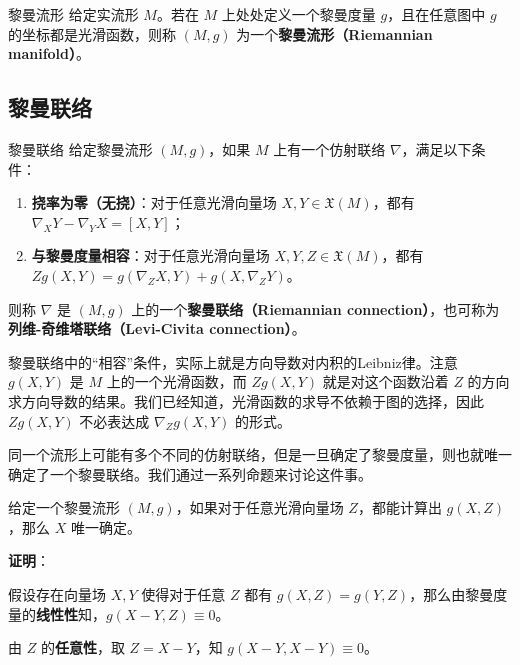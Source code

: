 \begin{definition}{黎曼流形}
给定实流形 $M$。若在 $M$ 上处处定义一个黎曼度量 $g$，且在任意图中 $g$ 的坐标都是光滑函数，则称 $(M, g)$ 为一个\textbf{黎曼流形（Riemannian manifold）}。
\end{definition}





\subsection{黎曼联络}

\begin{definition}{黎曼联络}\label{def_RieCon_1}
给定黎曼流形 $(M, g)$，如果 $M$ 上有一个仿射联络 $\nabla$，满足以下条件：
\begin{enumerate}
\item \textbf{挠率为零（无挠）}：对于任意光滑向量场 $X, Y\in\mathfrak{X}(M)$，都有 $\nabla_XY-\nabla_YX={[X, Y]}$；
\item \textbf{与黎曼度量相容}：对于任意光滑向量场 $X, Y, Z\in\mathfrak{X}(M)$，都有 $Zg(X, Y)=g(\nabla_ZX, Y)+g(X, \nabla_ZY)$。
\end{enumerate}
则称 $\nabla$ 是 $(M, g)$ 上的一个\textbf{黎曼联络（Riemannian connection）}，也可称为\textbf{列维-奇维塔联络（Levi-Civita connection）}。
\end{definition}

黎曼联络中的“相容”条件，实际上就是方向导数对内积的Leibniz律。注意 $g(X, Y)$ 是 $M$ 上的一个光滑函数，而 $Zg(X, Y)$ 就是对这个函数沿着 $Z$ 的方向求方向导数的结果。我们已经知道，光滑函数的求导不依赖于图的选择，因此 $Zg(X, Y)$ 不必表达成 $\nabla_Zg(X, Y)$ 的形式。

同一个流形上可能有多个不同的仿射联络，但是一旦确定了黎曼度量，则也就唯一确定了一个黎曼联络。我们通过一系列命题来讨论这件事。







\begin{lemma}{}\label{lem_RieCon_1}
给定一个黎曼流形 $(M, g)$，如果对于任意光滑向量场 $Z$，都能计算出 $g(X, Z)$，那么 $X$ 唯一确定。
\end{lemma}

\textbf{证明}：

假设存在向量场 $X, Y$ 使得对于任意 $Z$ 都有 $g(X, Z)=g(Y, Z)$，那么由黎曼度量的\textbf{线性性}知，$g(X-Y, Z)\equiv 0$。

由 $Z$ 的\textbf{任意性}，取 $Z=X-Y$，知 $g(X-Y, X-Y)\equiv 0$。


